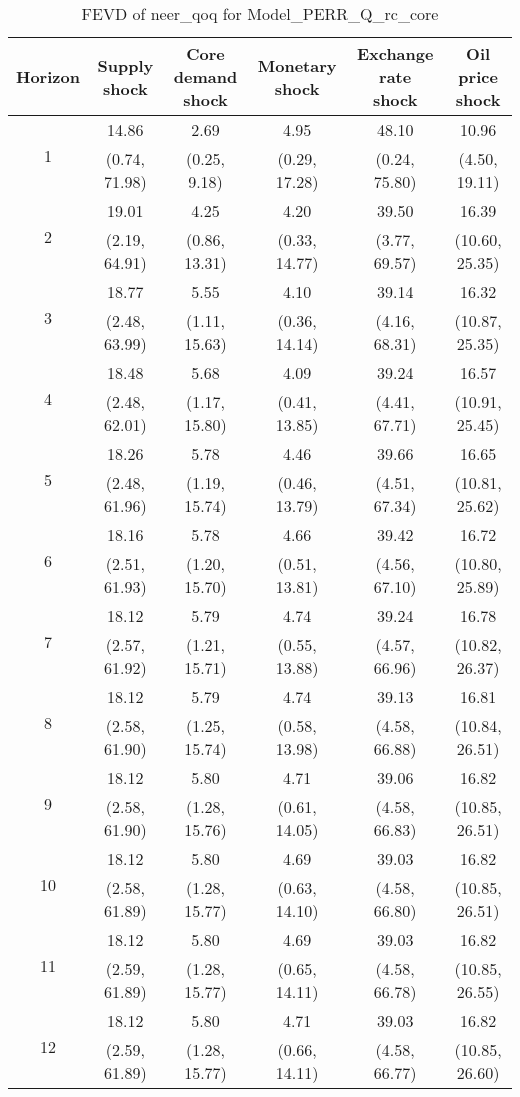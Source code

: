 \documentclass{article}
\begin{document}
\begin{table}
	\footnotesize
	\caption{FEVD of neer_qoq for Model_PERR_Q_rc_core}
	\begin{tabular}{cccccc}
		Horizon & Supply shock & Core demand shock & Monetary shock & Exchange rate shock & Oil price shock\\ \hline
		\multirow{2}{*}{1} & 14.86 & 2.69 & 4.95 & 48.10 & 10.96\\
		 & (0.74, 71.98) & (0.25, 9.18) & (0.29, 17.28) & (0.24, 75.80) & (4.50, 19.11)\\
		\multirow{2}{*}{2} & 19.01 & 4.25 & 4.20 & 39.50 & 16.39\\
		 & (2.19, 64.91) & (0.86, 13.31) & (0.33, 14.77) & (3.77, 69.57) & (10.60, 25.35)\\
		\multirow{2}{*}{3} & 18.77 & 5.55 & 4.10 & 39.14 & 16.32\\
		 & (2.48, 63.99) & (1.11, 15.63) & (0.36, 14.14) & (4.16, 68.31) & (10.87, 25.35)\\
		\multirow{2}{*}{4} & 18.48 & 5.68 & 4.09 & 39.24 & 16.57\\
		 & (2.48, 62.01) & (1.17, 15.80) & (0.41, 13.85) & (4.41, 67.71) & (10.91, 25.45)\\
		\multirow{2}{*}{5} & 18.26 & 5.78 & 4.46 & 39.66 & 16.65\\
		 & (2.48, 61.96) & (1.19, 15.74) & (0.46, 13.79) & (4.51, 67.34) & (10.81, 25.62)\\
		\multirow{2}{*}{6} & 18.16 & 5.78 & 4.66 & 39.42 & 16.72\\
		 & (2.51, 61.93) & (1.20, 15.70) & (0.51, 13.81) & (4.56, 67.10) & (10.80, 25.89)\\
		\multirow{2}{*}{7} & 18.12 & 5.79 & 4.74 & 39.24 & 16.78\\
		 & (2.57, 61.92) & (1.21, 15.71) & (0.55, 13.88) & (4.57, 66.96) & (10.82, 26.37)\\
		\multirow{2}{*}{8} & 18.12 & 5.79 & 4.74 & 39.13 & 16.81\\
		 & (2.58, 61.90) & (1.25, 15.74) & (0.58, 13.98) & (4.58, 66.88) & (10.84, 26.51)\\
		\multirow{2}{*}{9} & 18.12 & 5.80 & 4.71 & 39.06 & 16.82\\
		 & (2.58, 61.90) & (1.28, 15.76) & (0.61, 14.05) & (4.58, 66.83) & (10.85, 26.51)\\
		\multirow{2}{*}{10} & 18.12 & 5.80 & 4.69 & 39.03 & 16.82\\
		 & (2.58, 61.89) & (1.28, 15.77) & (0.63, 14.10) & (4.58, 66.80) & (10.85, 26.51)\\
		\multirow{2}{*}{11} & 18.12 & 5.80 & 4.69 & 39.03 & 16.82\\
		 & (2.59, 61.89) & (1.28, 15.77) & (0.65, 14.11) & (4.58, 66.78) & (10.85, 26.55)\\
		\multirow{2}{*}{12} & 18.12 & 5.80 & 4.71 & 39.03 & 16.82\\
		 & (2.59, 61.89) & (1.28, 15.77) & (0.66, 14.11) & (4.58, 66.77) & (10.85, 26.60)\\
	\end{tabular}
\label{tab:fevd-Model_PERR_Q_rc_core-neer_qoq}
\end{table}
\end{document}
